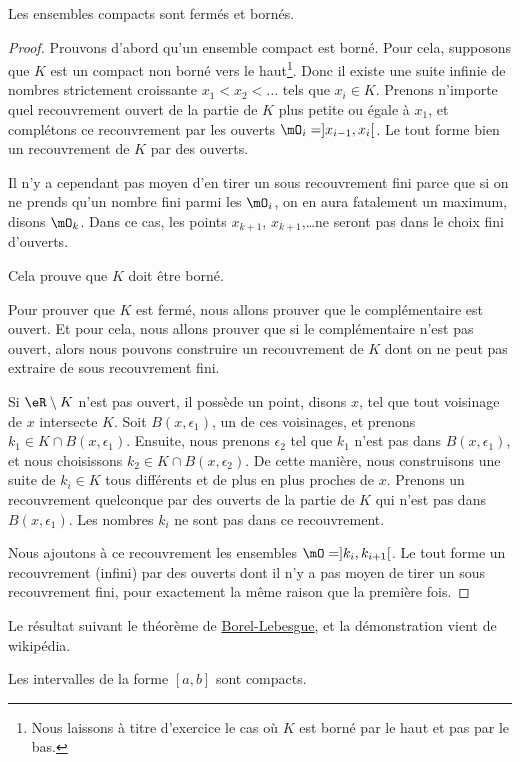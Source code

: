 \begin{proposition}
Les ensembles compacts sont fermés et bornés.
\end{proposition}

\begin{proof}
Prouvons d'abord qu'un ensemble compact est borné. Pour cela, supposons que $K$ est un compact non borné vers le haut\footnote{Nous laissons à titre d'exercice le cas où $K$ est borné par le haut et pas par le bas.}. Donc il existe une suite infinie de nombres strictement croissante $x_1<x_2<\ldots$ tels que $x_i\in K$. Prenons n'importe quel recouvrement ouvert de la partie de $K$ plus petite ou égale à $x_1$, et complétons ce recouvrement par les ouverts $\mO_i=]x_{i-1},x_i[$. Le tout forme bien un recouvrement de $K$ par des ouverts. 

Il n'y a cependant pas moyen d'en tirer un sous recouvrement fini parce que si on ne prends qu'un nombre fini parmi les $\mO_i$, on en aura fatalement un maximum, disons $\mO_k$. Dans ce cas, les points $x_{k+1}$, $x_{k+1}$,\ldots ne seront pas dans le choix fini d'ouverts.

Cela prouve que $K$ doit être borné.

Pour prouver que $K$ est fermé, nous allons prouver que le complémentaire est ouvert. Et pour cela, nous allons prouver que si le complémentaire n'est pas ouvert, alors nous pouvons construire un recouvrement de $K$ dont on ne peut pas extraire de sous recouvrement fini.

Si $\eR\setminus K$ n'est pas ouvert, il possède un point, disons $x$, tel que tout voisinage de $x$ intersecte $K$. Soit $B(x,\epsilon_1)$, un de ces voisinages, et prenons $k_1\in K\cap B(x,\epsilon_1)$. Ensuite, nous prenons $\epsilon_2$ tel que $k_1$ n'est pas dans $B(x,\epsilon_1)$, et nous choisissons $k_2\in K\cap B(x,\epsilon_2)$. De cette manière, nous construisons une suite de $k_i\in K$ tous différents et de plus en plus proches de $x$. Prenons un recouvrement quelconque par des ouverts de la partie de $K$ qui n'est pas dans $B(x,\epsilon_1)$. Les nombres $k_i$ ne sont pas dans ce recouvrement.

Nous ajoutons à ce recouvrement les ensembles $\mO=]k_i,k_{i+1}[$. Le tout forme un recouvrement (infini) par des ouverts dont il n'y a pas moyen de tirer un sous recouvrement fini, pour exactement la même raison que la première fois.
\end{proof}

Le résultat suivant le théorème de \href{http://fr.wikipedia.org/wiki/Théorème_de_Heine-Borel}{Borel-Lebesgue}, et la démonstration vient de wikipédia.
\begin{theorem}	\label{ThoBOrelLebesgue}
	Les intervalles de la forme $[a,b]$ sont compacts.
\end{theorem}


